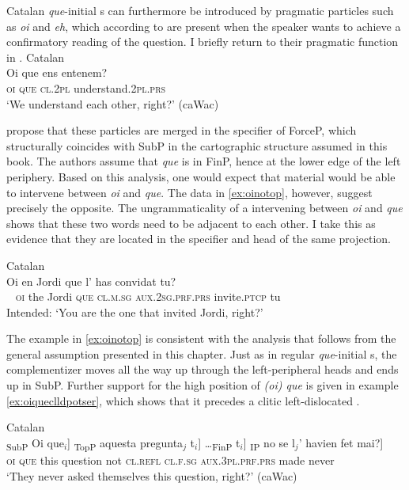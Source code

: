Catalan \emph{que}-initial s can furthermore be introduced by  pragmatic particles such as \emph{oi} and \emph{eh}, which according to \citet{PrietoRigau2007} are present when the speaker wants to achieve a confirmatory reading of the question. I briefly return to their pragmatic function in .  
\ea\label{ex:oique}
Catalan\\
\gll  Oi que ens entenem? \\
	\textsc{oi} \textsc{que} \textsc{cl.2pl} understand.\textsc{2pl.prs}\\
	\glt `We understand each other, right?' (caWac)
\z

\citet{PrietoRigau2007} propose that these particles are merged in the specifier of ForceP, which  structurally coincides with SubP in the cartographic structure assumed in this book. The authors assume that \emph{que} is in FinP, hence at the lower edge of the left periphery. Based on this analysis, one would expect that  material would be able to intervene between  \emph{oi} and \emph{que}. The data in \eqref{ex:oinotop}, however, suggest precisely the opposite.   The ungrammaticality of a  intervening between \emph{oi} and \emph{que} shows that these two words need to be adjacent to each other.  I take this as evidence  that  they are located in the specifier and head of the same projection.  

\ea Catalan \label{ex:oinotop}\\
\gll * Oi en Jordi que l' has convidat tu?\\
	~ \textsc{oi} the Jordi \textsc{que} \textsc{cl.m.sg} \textsc{aux.2sg.prf.prs} invite.\textsc{ptcp} tu\\
	\glt Intended: `You are the one that invited Jordi, right?'
\z 

The example in \eqref{ex:oinotop} is consistent with the analysis that follows from the general assumption presented in this chapter. Just as in regular \emph{que}-initial s, the complementizer moves all the way up through the left-peripheral heads and ends up in SubP. Further support for the high position of \emph{(oi) que} is given in example \eqref{ex:oiqueclldpotser}, which shows that it precedes a clitic left-dislocated .\largerpage[2]

\ea \label{ex:oiqueclldpotser}
Catalan\\
\gll  {\ob}\textsubscript{SubP} Oi que$_i$] {\ob}\textsubscript{TopP} aquesta pregunta$_j$ t$_i$] \dots {\ob}\textsubscript{FinP} t$_i$] {\ob}\textsubscript{IP} no se l$_j$' havien fet mai?] \\
{} \textsc{oi} \textsc{que} {} this question {} {}  {} {} not \textsc{cl.refl} \textsc{cl.f.sg} \textsc{aux.3pl.prf.prs} made never\\
\glt `They never asked themselves this question, right?' (caWac)
\z

